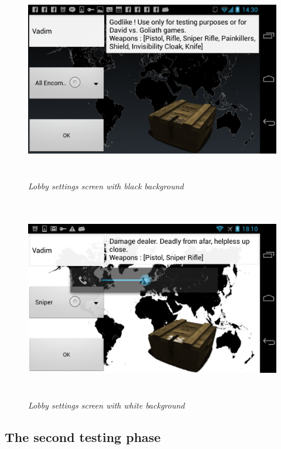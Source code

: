 \begin{enumerate}
  \begin{figure}
  \includegraphics[height=3.5in,width=6.23in]{./images/android_screenshots/second_development/game_second_development_8.png}
  \caption{\small \sl Lobby settings screen with black background
  \label{fig:lobby_settings_background_black}}
  \end{figure}

  \begin{figure}
  \includegraphics[height=3.5in,width=6.23in]{./images/android_screenshots/lobby_settings_background_white.png}
  \caption{\small \sl Lobby settings screen with white background
  \label{fig:lobby_settings_background_white}}
  \end{figure}
  
\end{enumerate}

\subsection{The second testing phase}

